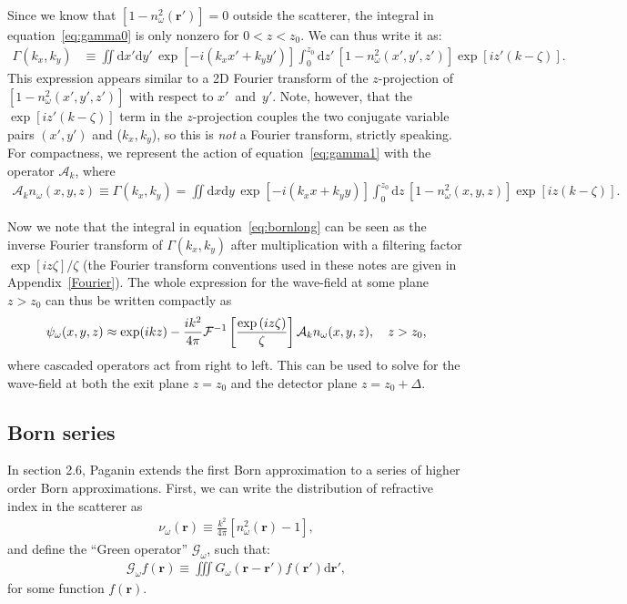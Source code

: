 \documentclass{article}
\begin{document}
Since we know that $\left[1 - n_{\omega}^2(\bm{r}')\right] = 0$ outside the
scatterer, the integral in equation~\ref{eq:gamma0} is only nonzero for
$0 < z < z_0$. We can thus write it as:
\begin{align}
  \Gamma(k_x, k_y) &\equiv \iint \mathrm{d}x' \mathrm{d}y'\,\exp\left[-i\left(k_x x' + k_y y'\right)\right]\int_0^{z_0}\mathrm{d}z'\,\left[1 - n_{\omega}^2(x',y',z')\right]\exp\left[iz'(k - \zeta)\right].\label{eq:gamma1}
\end{align}
This expression appears similar to a 2D Fourier transform of the $z$-projection
of $\left[1 - n_{\omega}^2(x',y',z')\right]$ with respect to $x'$~and~$y'$.
Note, however, that the $\exp\left[iz'(k-\zeta)\right]$ term in the
$z$-projection couples the two conjugate variable pairs $(x', y')$ and
($k_x, k_y$), so this is \textit{not} a Fourier transform, strictly speaking. For
compactness, we represent the action of equation~\ref{eq:gamma1} with the
operator $\mathcal{A}_k$, where
\begin{align}
  \mathcal{A}_k n_{\omega}(x,y,z) \equiv \Gamma(k_x, k_y) =\iint \mathrm{d}x \mathrm{d}y\,\exp\left[-i\left(k_x x + k_y y\right)\right]\int_0^{z_0}\mathrm{d}z\,\left[1 - n_{\omega}^2(x,y,z)\right]\exp\left[iz(k - \zeta)\right].
\end{align}

Now we note that the integral in equation~\ref{eq:bornlong} can be seen as the
inverse Fourier transform of $\Gamma(k_x, k_y)$ after multiplication with a
filtering factor $\exp\left[iz\zeta\right]/\zeta$ (the Fourier transform
conventions used in these notes are given in Appendix~\ref{Fourier}). The whole
expression for the wave-field at some plane $z > z_0$ can thus be written
compactly as
\begin{align}
  \psi_{\omega}(x,y,z) \approx \exp(ikz) - \frac{ik^2}{4\pi}\mathcal{F}^{-1}\left[\frac{\exp\left(iz\zeta\right)}{\zeta}\right]\mathcal{A}_k n_{\omega}(x,y,z),\quad z > z_0,
  \label{eq:firstbornapproximation}
\end{align}
where cascaded operators act from right to left. This can be used to solve for
the wave-field at both the exit plane $z=z_0$ and the detector plane
$z = z_0 + \Delta$.

\subsection{Born series}
In section 2.6, Paganin extends the first Born approximation to a series of
higher order Born approximations. First, we can write the distribution of
refractive index in the scatterer as
\begin{align}
  \nu_{\omega}(\bm{r}) \equiv \frac{k^2}{4\pi}\left[n_{\omega}^2(\bm{r}) - 1\right],
\end{align}
and define the ``Green operator'' $\mathcal{G}_{\omega}$, such that:
\begin{align}
  \mathcal{G}_{\omega} f(\bm{r}) \equiv \iiint G_{\omega}(\bm{r} - \bm{r}')f(\bm{r}')\mathrm{d}\bm{r}',
\end{align}
for some function $f(\bm{r})$.
\end{document}

